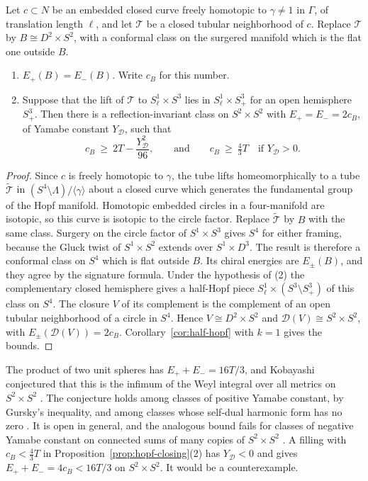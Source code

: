 \begin{proposition}
\label{prop:hopf-closing}
Let \(c\subset N\) be an embedded closed curve freely homotopic to
\(\gamma\ne1\) in \(\Gamma\), of translation length \(\ell\), and let
\(\mathcal T\) be a closed tubular neighborhood of \(c\). Replace
\(\mathcal T\) by \(B\cong D^2\times S^2\), with a conformal class on
the surgered manifold which is the flat one outside \(B\).
\begin{enumerate}
\item \(E_+(B)=E_-(B)\). Write \(c_B\) for this number.
\item Suppose that the lift of \(\mathcal T\) to
\(S^1_\ell\times S^3\) lies in \(S^1_\ell\times S^3_+\) for an open
hemisphere \(S^3_+\). Then there is a reflection-invariant class on
\(S^2\times S^2\) with \(E_+=E_-=2c_B\), of Yamabe constant
\(Y_{\mathcal D}\), such that
\[
 c_B\ \ge\ 2T-\frac{Y_{\mathcal D}^2}{96},\qquad\text{and}\qquad
 c_B\ \ge\ \tfrac43T\quad\text{if }Y_{\mathcal D}>0 .
\]
\end{enumerate}
\end{proposition}
\begin{proof}
Since \(c\) is freely homotopic to \(\gamma\), the tube lifts
homeomorphically to a tube \(\widetilde{\mathcal T}\) in
\((S^4\setminus\Lambda)/\langle\gamma\rangle\) about a closed curve
which generates the fundamental group of the Hopf manifold. Homotopic
embedded circles in a four-manifold are isotopic, so this curve is
isotopic to the circle factor. Replace \(\widetilde{\mathcal T}\) by
\(B\) with the same class. Surgery on the circle factor of
\(S^1\times S^3\) gives \(S^4\) for either framing, because the Gluck
twist of \(S^1\times S^2\) extends over \(S^1\times D^3\). The result
is therefore a conformal class on \(S^4\) which is flat outside \(B\).
Its chiral energies are \(E_\pm(B)\), and they agree by the signature
formula. Under the hypothesis of (2) the complementary closed
hemisphere gives a half-Hopf piece
\(S^1_\ell\times(S^3\setminus S^3_+)\) of this class on \(S^4\). The
closure \(V\) of its complement is the complement of an open tubular
neighborhood of a circle in \(S^4\). Hence \(V\cong D^2\times S^2\)
and \(\mathcal D(V)\cong S^2\times S^2\), with
\(E_\pm(\mathcal D(V))=2c_B\). Corollary~\ref{cor:half-hopf} with
\(k=1\) gives the bounds.
\end{proof}

The product of two unit spheres has \(E_++E_-=16T/3\), and Kobayashi
conjectured that this is the infimum of the Weyl integral over all
metrics on \(S^2\times S^2\) \cite{Kobayashi1985Conformal}. The
conjecture holds among classes of positive Yamabe constant, by
Gursky's inequality, and among classes whose self-dual harmonic form
has no zero \cite[Theorem~B]{LeBrun2013DelPezzo}. It is open in
general, and the analogous bound fails for classes of negative Yamabe
constant on connected sums of many copies of \(S^2\times S^2\)
\cite[Theorem~A]{LeBrun2023Balance}. A filling with \(c_B<\tfrac43T\)
in Proposition~\ref{prop:hopf-closing}(2) has \(Y_{\mathcal D}<0\) and
gives \(E_++E_-=4c_B<16T/3\) on \(S^2\times S^2\). It would be a
counterexample.

